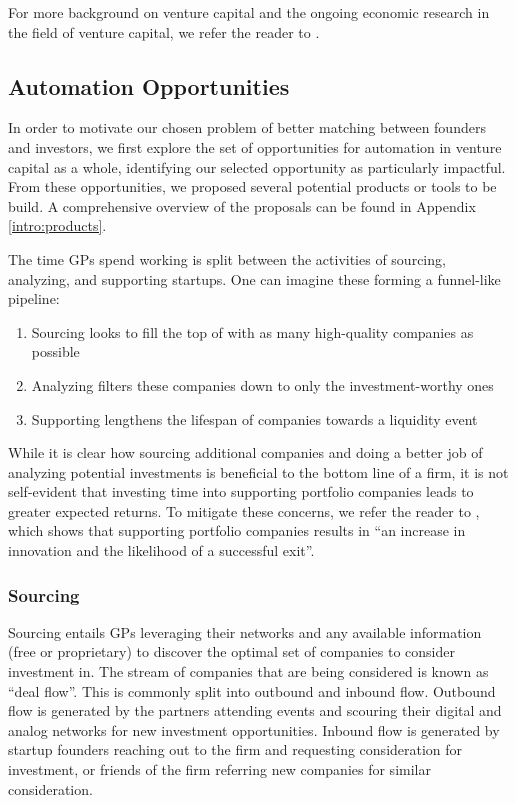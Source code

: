 For more background on venture capital and the ongoing economic research in the field of venture capital, we refer the reader to \cite{venture-survey}.

\subsection{Automation Opportunities}

In order to motivate our chosen problem of better matching between founders and investors, we first explore the set of opportunities for automation in venture capital as a whole, identifying our selected opportunity as particularly impactful. From these opportunities, we proposed several potential products or tools to be build. A comprehensive overview of the proposals can be found in Appendix \ref{intro:products}.

The time GPs spend working is split between the activities of sourcing, analyzing, and supporting startups. One can imagine these forming a funnel-like pipeline:

\begin{enumerate}
  \item Sourcing looks to fill the top of with as many high-quality companies as possible
  \item Analyzing filters these companies down to only the investment-worthy ones
  \item Supporting lengthens the lifespan of companies towards a liquidity event
\end{enumerate}

While it is clear how sourcing additional companies and doing a better job of analyzing potential investments is beneficial to the bottom line of a firm, it is not self-evident that investing time into supporting portfolio companies leads to greater expected returns. To mitigate these concerns, we refer the reader to \cite{JOFI:JOFI12370}, which shows that supporting portfolio companies results in ``an increase in innovation and the likelihood of a successful exit''.

\subsubsection{Sourcing}

Sourcing entails GPs leveraging their networks and any available information (free or proprietary) to discover the optimal set of companies to consider investment in. The stream of companies that are being considered is known as ``deal flow''. This is commonly split into outbound and inbound flow. Outbound flow is generated by the partners attending events and scouring their digital and analog networks for new investment opportunities. Inbound flow is generated by startup founders reaching out to the firm and requesting consideration for investment, or friends of the firm referring new companies for similar consideration.

